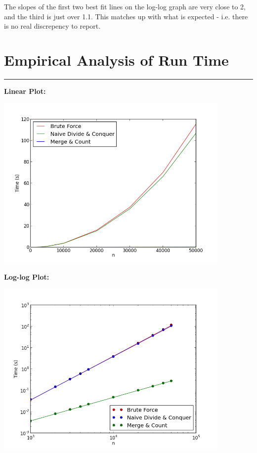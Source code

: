 \documentclass[letterpaper,10pt,titlepage,fleqn]{article}
\begin{document}
The slopes of the first two best fit lines on the log-log graph are very close to 2, and the third is just over 1.1. This matches up with what is expected - i.e. there is no real discrepency to report.

\newpage

\section*{Empirical Analysis of Run Time}
\hrule
\textbf{Linear Plot:}
\vskip 0.04in
\begin{center}
\includegraphics[width=4.5in]{input_time.png}
\end{center}
\textbf{Log-log Plot:}
\vskip 0.04in
\begin{center}
\includegraphics[width=4.5in]{loglog.png}
\end{center}
\end{document}
